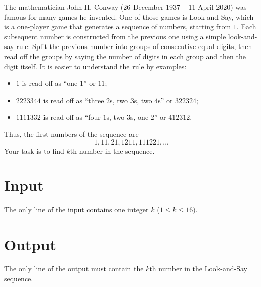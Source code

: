 
The mathematician John H. Conway (26 December 1937 – 11 April 2020) was famous for many games he invented.
One of those games is Look-and-Say, which is a one-player game that generates a sequence of numbers, starting from $1$.
Each subsequent number is constructed from the previous one using a simple look-and-say rule:
Split the previous number into groups of consecutive equal digits, then read off the groups by saying the number of digits in each group and then the digit itself.
It is easier to understand the rule by examples:
\begin{itemize}
    \item $1$ is read off as ``one $1$'' or $11$;
    \item $2223344$ is read off as ``three $2$s, two $3$s, two $4$s'' or $322324$;
    \item $1111332$ is read off as ``four $1$s, two $3$s, one $2$'' or $412312$.
\end{itemize}

Thus, the first numbers of the sequence are
\[
    1, 11, 21, 1211, 111221, ...
\]
Your task is to find $k$th number in the sequence.

\section*{Input}
The only line of the input contains one integer $k$ ($1 \leq k \leq 16)$.
\section*{Output}
The only line of the output must contain the $k$th number in the Look-and-Say sequence.

{
}


